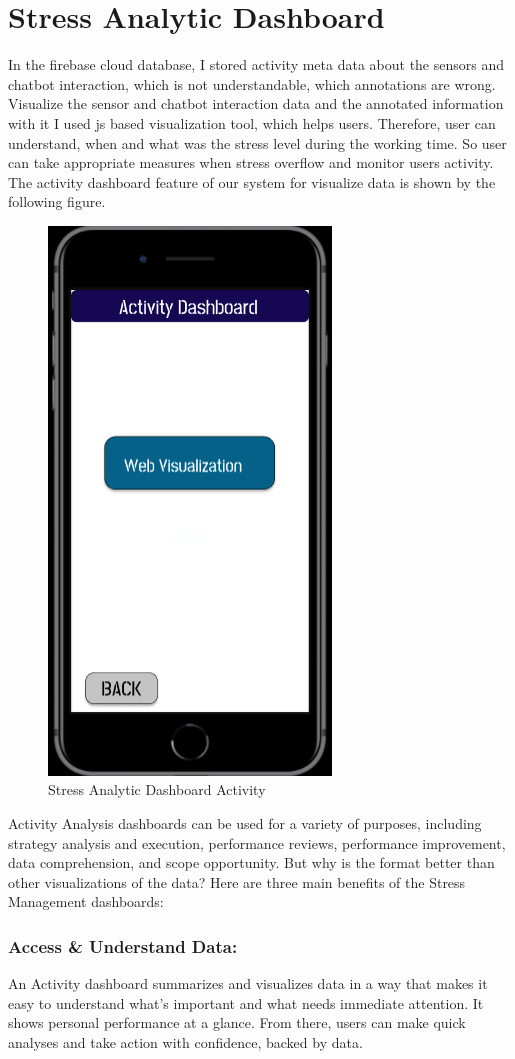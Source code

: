 \section{Stress Analytic Dashboard}
In the firebase cloud database, I stored activity meta data about the sensors and chatbot interaction, which is not understandable, which annotations are wrong. Visualize the sensor and chatbot interaction data and the annotated information with it I used \acf{js} based visualization tool, which helps users. Therefore, user can understand, when and what was the stress level during the working time. So user can take appropriate measures when stress overflow and monitor users activity. The activity dashboard feature of our system for visualize data is shown by the following figure.
\begin{figure}[hbt!] 
  \centering
  \includegraphics[width=0.4\linewidth]{chap4/image4/dashboard.png}
  \caption[Stress Analytic Dashboard Activity ]{Stress Analytic Dashboard Activity}
  \label{fig:dashboard}
\end{figure}
Activity Analysis dashboards can be used for a variety of purposes, including strategy analysis and execution, performance reviews, performance improvement, data comprehension, and scope opportunity. But why is the format better than other visualizations of the data? Here are three main benefits of the Stress Management dashboards:
\subsubsection*{Access \& Understand Data:}
An Activity dashboard summarizes and visualizes data in a way that makes it easy to understand what’s important and what needs immediate attention. It shows personal performance at a glance. From there, users can make quick analyses and take action with confidence, backed by data. 
